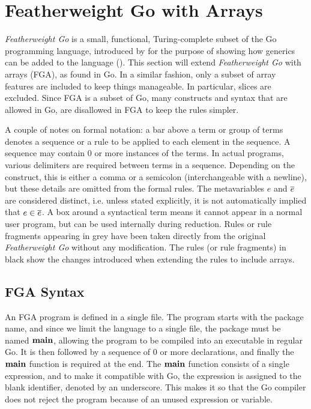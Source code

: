 \section{Featherweight Go with Arrays}

\emph{Featherweight Go} is a small, functional, Turing-complete subset of the Go
programming language, introduced by \citeauthor{fg} for the purpose of showing
how generics can be added to the language (\citeyear{fg}). This section will
extend \emph{Featherweight Go} with arrays (FGA), as found in Go. In a similar
fashion, only a subset of array features are included to keep things manageable.
In particular, slices are excluded. Since FGA is a subset of Go, many constructs
and syntax that are allowed in Go, are disallowed in FGA to keep the rules
simpler.

A couple of notes on formal notation: a bar above a term or group of terms
denotes a sequence or a rule to be applied to each element in the sequence. A
sequence may contain 0 or more instances of the terms. In actual programs,
various delimiters are required between terms in a sequence. Depending on the
construct, this is either a comma or a semicolon (interchangeable with a
newline), but these details are omitted from the formal rules. The metavariables
$e$ and $\overline{e}$ are considered distinct, i.e. unless stated explicitly, it is
not automatically implied that $e \in \overline{e}$. A box around a syntactical term
means it cannot appear in a normal user program, but can be used internally
during reduction. Rules or rule fragments appearing in grey have been taken
directly from the original \emph{Featherweight Go} \autocite{fg} without any
modification. The rules (or rule fragments) in black show the changes introduced
when extending the rules to include arrays.

\subsection{FGA Syntax}

An FGA program is defined in a single file. The program starts with the package
name, and since we limit the language to a single file, the package must be
named $\texttt{\bf main}$, allowing the program to be compiled into an executable in regular
Go. It is then followed by a sequence of 0 or more declarations, and finally the
$\texttt{\bf main}$ function is required at the end. The $\texttt{\bf main}$ function consists of a
single expression, and to make it compatible with Go, the expression is assigned
to the blank identifier, denoted by an underscore. This makes it so that the Go
compiler does not reject the program because of an unused expression or
variable.


